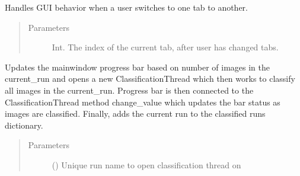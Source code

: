 \documentclass[letterpaper,10pt,english]{sphinxmanual}
\begin{document}
\begin{fulllineitems}
\begin{fulllineitems}
\label{\detokenize{polo.windows:polo.windows.main_window.MainWindow.on_changed_tab}}
Handles GUI behavior when a user switches to one tab to another.
\begin{quote}\begin{description}
\item[{Parameters}] \leavevmode
{} \textendash{} Int. The index of the current tab, after user has changed tabs.

\end{description}\end{quote}

\end{fulllineitems}


\begin{fulllineitems}
\label{\detokenize{polo.windows:polo.windows.main_window.MainWindow.open_classification_thread}}
Updates the mainwindow progress bar based on number of images in the
current\_run and opens a new ClassificationThread which then works to
classify all images in the current\_run. Progress bar is then connected
to the ClassificationThread method change\_value which updates the bar
status as images are classified. Finally, adds the current run to the
classified runs dictionary.
\begin{quote}\begin{description}
\item[{Parameters}] \leavevmode
{} () \textendash{} Unique run name to open classification thread on

\end{description}\end{quote}

\end{fulllineitems}



\end{fulllineitems}
\end{document}
